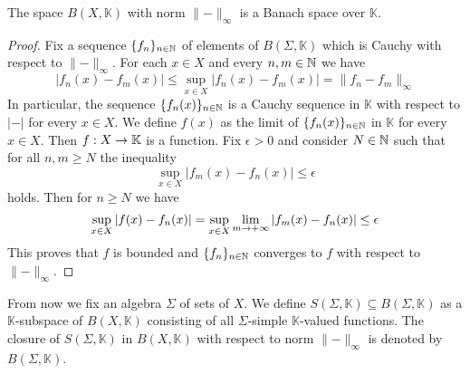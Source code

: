 \begin{theorem}\label{theorem:Banach_space_of_bounded_functions}
    The space $B(X,\mathbb{K})$ with norm $\lVert-\rVert_{\infty}$ is a Banach space over $\mathbb{K}$.
\end{theorem}
\begin{proof}
    Fix a sequence $\{f_n\}_{n\in {\mathbb N}}$ of elements of $B(\Sigma,\mathbb{K})$ which is Cauchy with respect to $\lVert-\rVert_{\infty}$. For each $x \in X$ and every $n,m\in {\mathbb N}$ we have
    $$|f_n(x) - f_m(x)|\leq \sup_{x\in X}|f_n(x) - f_m(x)| = \lVert f_n - f_m \rVert_{\infty}$$
    In particular, the sequence $\{f_n(x)\}_{n\in {\mathbb N}}$ is a Cauchy sequence in $\mathbb{K}$ with respect to $|-|$ for every $x \in X$. We define $f(x)$ as the limit of $\{f_n(x)\}_{n\in {\mathbb N}}$ in $\mathbb{K}$ for every $x \in X$. Then $f:X\rightarrow \mathbb{K}$ is a function. Fix $\epsilon > 0$ and consider $N \in {\mathbb N}$ such that for all $n,m\geq N$ the inequality
    $$\sup_{x\in X}|f_m(x) - f_n(x)|\leq \epsilon$$
    holds. Then for $n \geq N$ we have
    $$\sup_{x\in X}|f(x) - f_n(x)| = \sup_{x\in X}\lim_{m\rightarrow +\infty}|f_m(x) - f_n(x)| \leq \epsilon$$
    This proves that $f$ is bounded and $\{f_n\}_{n\in {\mathbb N}}$ converges to $f$ with respect to $\lVert -\rVert_{\infty}$.
\end{proof}
\noindent
From now we fix an algebra $\Sigma$ of sets of $X$. We define $S(\Sigma,\mathbb{K})\subseteq B(\Sigma,\mathbb{K})$ as a $\mathbb{K}$-subspace of $B(X,\mathbb{K})$ consisting of all $\Sigma$-simple $\mathbb{K}$-valued functions. The closure of $S(\Sigma,\mathbb{K})$ in $B(X,\mathbb{K})$ with respect to norm $\lVert - \rVert_{\infty}$ is denoted by $B(\Sigma,\mathbb{K})$.


